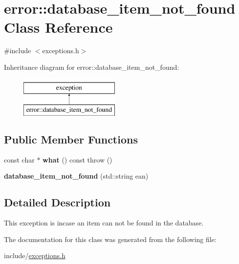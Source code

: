\hypertarget{classerror_1_1database__item__not__found}{}\section{error\+:\+:database\+\_\+item\+\_\+not\+\_\+found Class Reference}
\label{classerror_1_1database__item__not__found}


{\ttfamily \#include $<$exceptions.\+h$>$}

Inheritance diagram for error\+:\+:database\+\_\+item\+\_\+not\+\_\+found\+:\begin{figure}[H]
\begin{center}
\leavevmode
\includegraphics[height=2.000000cm]{classerror_1_1database__item__not__found}
\end{center}
\end{figure}
\subsection*{Public Member Functions}
\begin{DoxyCompactItemize}
\item 
\mbox{\label{classerror_1_1database__item__not__found_a8b3dbc0fa6f4a6307b4b993180192539}} 
const char $\ast$ {\bfseries what} () const  throw ()
\item 
\mbox{\label{classerror_1_1database__item__not__found_aecf12e8b8e51ccc333eff3105ca45f03}} 
{\bfseries database\+\_\+item\+\_\+not\+\_\+found} (std\+::string ean)
\end{DoxyCompactItemize}


\subsection{Detailed Description}
This exception is incase an item can not be found in the database. 

The documentation for this class was generated from the following file\+:\begin{DoxyCompactItemize}
\item 
include/\mbox{\hyperlink{exceptions_8h}{exceptions.\+h}}\end{DoxyCompactItemize}
